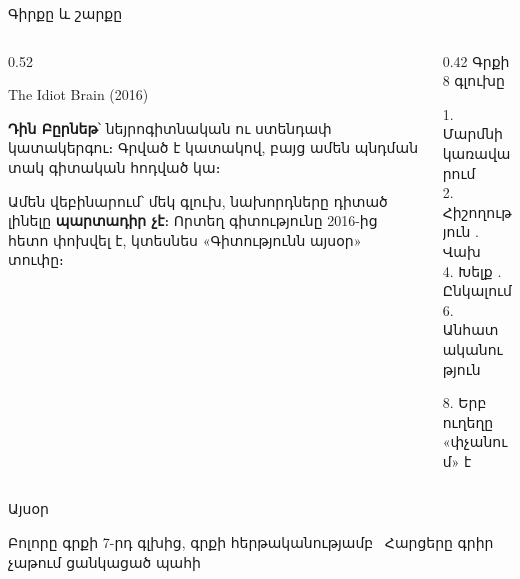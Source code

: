 \begin{frame}{Գիրքը և շարքը}
  \begin{columns}[T]
    \begin{column}{0.52\textwidth}
      \begin{card}
        {\blackfont\Large The Idiot Brain} {\small (2016)}\par\smallskip
        \textbf{Դին Բըրնեթ}՝ նեյրոգիտնական ու ստենդափ կատակերգու։ Գրված է կատակով, բայց ամեն պնդման տակ գիտական հոդված կա։
      \end{card}
      \begin{card}[colback=mint!35!cardwhite]
        Ամեն վեբինարում՝ մեկ գլուխ, նախորդները դիտած լինելը \textbf{պարտադիր չէ}։ Որտեղ գիտությունը 2016-ից հետո փոխվել է, կտեսնես «Գիտությունն այսօր» տուփը։
      \end{card}
    \end{column}
    \begin{column}{0.42\textwidth}
      {\blackfont\small Գրքի 8 գլուխը}\par\smallskip
      {\color{plum!50!cream}\small
      1. Մարմնի կառավարում\\
      2. Հիշողություն . Վախ\\
      4. Խելք . Ընկալում\\
      6. Անհատականություն}\par\smallskip
      \par\smallskip
      {\color{plum!50!cream}\small 8. Երբ ուղեղը «փչանում» է}
    \end{column}
  \end{columns}
\end{frame}

\begin{frame}{Այսօր}
  \centering
  \par\vspace{5mm}
  {\small Բոլորը գրքի 7-րդ գլխից, գրքի հերթականությամբ \qquad {}\ Հարցերը գրիր չաթում ցանկացած պահի}
\end{frame}

